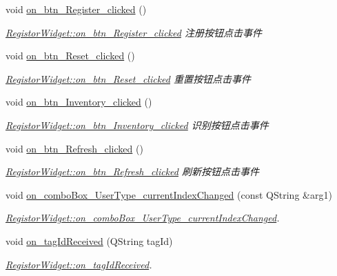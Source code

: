\begin{DoxyCompactItemize}
\item 
void \mbox{\hyperlink{class_registor_widget_ae280a0ef976dd2835f4a33c60b67e8a9}{on\+\_\+btn\+\_\+\+Register\+\_\+clicked}} ()
\begin{DoxyCompactList}\small\item\em \mbox{\hyperlink{class_registor_widget_ae280a0ef976dd2835f4a33c60b67e8a9}{Registor\+Widget\+::on\+\_\+btn\+\_\+\+Register\+\_\+clicked}} 注册按钮点击事件 \end{DoxyCompactList}\item 
void \mbox{\hyperlink{class_registor_widget_aea14551286d02e5bdfcbd6d0114382fb}{on\+\_\+btn\+\_\+\+Reset\+\_\+clicked}} ()
\begin{DoxyCompactList}\small\item\em \mbox{\hyperlink{class_registor_widget_aea14551286d02e5bdfcbd6d0114382fb}{Registor\+Widget\+::on\+\_\+btn\+\_\+\+Reset\+\_\+clicked}} 重置按钮点击事件 \end{DoxyCompactList}\item 
void \mbox{\hyperlink{class_registor_widget_a4bbc6a6b1f22c708966d79a5947e36b1}{on\+\_\+btn\+\_\+\+Inventory\+\_\+clicked}} ()
\begin{DoxyCompactList}\small\item\em \mbox{\hyperlink{class_registor_widget_a4bbc6a6b1f22c708966d79a5947e36b1}{Registor\+Widget\+::on\+\_\+btn\+\_\+\+Inventory\+\_\+clicked}} 识别按钮点击事件 \end{DoxyCompactList}\item 
void \mbox{\hyperlink{class_registor_widget_adb55365b88e07391d6e8e7c639c68219}{on\+\_\+btn\+\_\+\+Refresh\+\_\+clicked}} ()
\begin{DoxyCompactList}\small\item\em \mbox{\hyperlink{class_registor_widget_adb55365b88e07391d6e8e7c639c68219}{Registor\+Widget\+::on\+\_\+btn\+\_\+\+Refresh\+\_\+clicked}} 刷新按钮点击事件 \end{DoxyCompactList}\item 
void \mbox{\hyperlink{class_registor_widget_a088f8bd641902d9be5eeacecd0cddcdc}{on\+\_\+combo\+Box\+\_\+\+User\+Type\+\_\+current\+Index\+Changed}} (const Q\+String \&arg1)
\begin{DoxyCompactList}\small\item\em \mbox{\hyperlink{class_registor_widget_a088f8bd641902d9be5eeacecd0cddcdc}{Registor\+Widget\+::on\+\_\+combo\+Box\+\_\+\+User\+Type\+\_\+current\+Index\+Changed}}. \end{DoxyCompactList}\item 
void \mbox{\hyperlink{class_registor_widget_a7f2af14f69efa2bdc0d57f9957cc1dc1}{on\+\_\+tag\+Id\+Received}} (Q\+String tag\+Id)
\begin{DoxyCompactList}\small\item\em \mbox{\hyperlink{class_registor_widget_a7f2af14f69efa2bdc0d57f9957cc1dc1}{Registor\+Widget\+::on\+\_\+tag\+Id\+Received}}. \end{DoxyCompactList}\end{DoxyCompactItemize}
